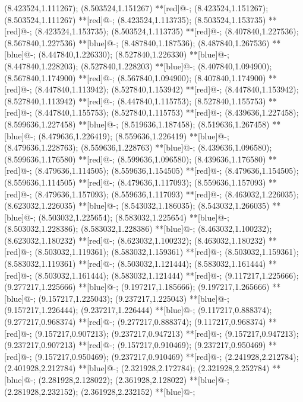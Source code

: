 (8.423524,1.111267); (8.503524,1.151267) **[red]@{-};
(8.423524,1.151267); (8.503524,1.111267) **[red]@{-};
(8.423524,1.113735); (8.503524,1.153735) **[red]@{-};
(8.423524,1.153735); (8.503524,1.113735) **[red]@{-};
(8.407840,1.227536); (8.567840,1.227536) **[blue]@{-};
(8.487840,1.187536); (8.487840,1.267536) **[blue]@{-};
(8.447840,1.226330); (8.527840,1.226330) **[blue]@{-};
(8.447840,1.228203); (8.527840,1.228203) **[blue]@{-};
(8.407840,1.094900); (8.567840,1.174900) **[red]@{-};
(8.567840,1.094900); (8.407840,1.174900) **[red]@{-};
(8.447840,1.113942); (8.527840,1.153942) **[red]@{-};
(8.447840,1.153942); (8.527840,1.113942) **[red]@{-};
(8.447840,1.115753); (8.527840,1.155753) **[red]@{-};
(8.447840,1.155753); (8.527840,1.115753) **[red]@{-};
(8.439636,1.227458); (8.599636,1.227458) **[blue]@{-};
(8.519636,1.187458); (8.519636,1.267458) **[blue]@{-};
(8.479636,1.226419); (8.559636,1.226419) **[blue]@{-};
(8.479636,1.228763); (8.559636,1.228763) **[blue]@{-};
(8.439636,1.096580); (8.599636,1.176580) **[red]@{-};
(8.599636,1.096580); (8.439636,1.176580) **[red]@{-};
(8.479636,1.114505); (8.559636,1.154505) **[red]@{-};
(8.479636,1.154505); (8.559636,1.114505) **[red]@{-};
(8.479636,1.117093); (8.559636,1.157093) **[red]@{-};
(8.479636,1.157093); (8.559636,1.117093) **[red]@{-};
(8.463032,1.226035); (8.623032,1.226035) **[blue]@{-};
(8.543032,1.186035); (8.543032,1.266035) **[blue]@{-};
(8.503032,1.225654); (8.583032,1.225654) **[blue]@{-};
(8.503032,1.228386); (8.583032,1.228386) **[blue]@{-};
(8.463032,1.100232); (8.623032,1.180232) **[red]@{-};
(8.623032,1.100232); (8.463032,1.180232) **[red]@{-};
(8.503032,1.119361); (8.583032,1.159361) **[red]@{-};
(8.503032,1.159361); (8.583032,1.119361) **[red]@{-};
(8.503032,1.121444); (8.583032,1.161444) **[red]@{-};
(8.503032,1.161444); (8.583032,1.121444) **[red]@{-};
(9.117217,1.225666); (9.277217,1.225666) **[blue]@{-};
(9.197217,1.185666); (9.197217,1.265666) **[blue]@{-};
(9.157217,1.225043); (9.237217,1.225043) **[blue]@{-};
(9.157217,1.226444); (9.237217,1.226444) **[blue]@{-};
(9.117217,0.888374); (9.277217,0.968374) **[red]@{-};
(9.277217,0.888374); (9.117217,0.968374) **[red]@{-};
(9.157217,0.907213); (9.237217,0.947213) **[red]@{-};
(9.157217,0.947213); (9.237217,0.907213) **[red]@{-};
(9.157217,0.910469); (9.237217,0.950469) **[red]@{-};
(9.157217,0.950469); (9.237217,0.910469) **[red]@{-};
(2.241928,2.212784); (2.401928,2.212784) **[blue]@{-};
(2.321928,2.172784); (2.321928,2.252784) **[blue]@{-};
(2.281928,2.128022); (2.361928,2.128022) **[blue]@{-};
(2.281928,2.232152); (2.361928,2.232152) **[blue]@{-};
